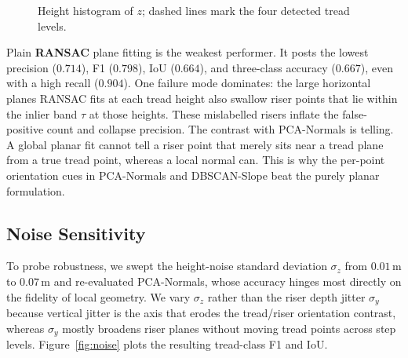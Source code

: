 \begin{figure}[t]\centering
{}
\caption{Height histogram of $z$; dashed lines mark the four detected tread levels.}
\label{fig:hist}
\end{figure}

Plain \textbf{RANSAC} plane fitting is the weakest performer. It posts the
lowest precision ($0.714$), F1 ($0.798$), IoU ($0.664$), and three-class
accuracy ($0.667$), even with a high recall ($0.904$). One failure mode
dominates: the large horizontal planes RANSAC fits at each tread height
also swallow riser points that lie within the inlier band $\tau$ at those
heights. These mislabelled risers inflate the false-positive count and
collapse precision. The contrast with PCA-Normals is telling. A global
planar fit cannot tell a riser point that merely sits near a tread plane
from a true tread point, whereas a local normal can. This is why the
per-point orientation cues in PCA-Normals and DBSCAN-Slope beat the purely
planar formulation.

\subsection{Noise Sensitivity}

To probe robustness, we swept the height-noise standard deviation
$\sigma_z$ from $0.01$\,m to $0.07$\,m and re-evaluated PCA-Normals, whose
accuracy hinges most directly on the fidelity of local geometry. We vary
$\sigma_z$ rather than the riser depth jitter $\sigma_y$ because vertical
jitter is the axis that erodes the tread/riser orientation contrast,
whereas $\sigma_y$ mostly broadens riser planes without moving tread points
across step levels. Figure~\ref{fig:noise} plots the resulting tread-class
F1 and IoU.

